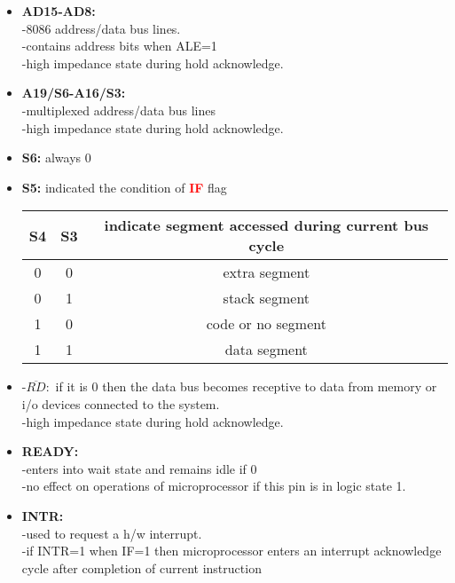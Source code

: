 \documentclass[12pt]{article}
\begin{document}
\begin{itemize}
\begin{itemize}
		\item \textbf{AD15-AD8:}\\
		-8086 address/data bus lines.\\
		-contains address bits when ALE=1\\
		-high impedance state during hold acknowledge.\\
		
		\item \textbf{A19/S6-A16/S3:}\\
		-multiplexed address/data bus lines\\
		-high impedance state during hold acknowledge.\\
		
		\item\textbf{S6:} always 0\\
		\item\textbf{S5:} indicated the condition of \textbf{\textcolor{red}{IF}} flag\\
		
		\begin{table}[H]
			\centering
			\begin{tabular}{|c|c|c|}
				\hline
				S4 & S3 & indicate segment accessed  during current bus cycle\\\hline
				
				0 & 0 & extra segment\\\hline
				0 & 1 & stack segment\\\hline
				1 & 0 & code or no segment\\\hline
				1 & 1 & data segment\\\hline
			\end{tabular}
		\end{table}
	
		\item -$\overline{RD}:$ if it is 0 then the data bus becomes receptive to data from memory or i/o devices connected to the system.\\
		-high impedance state during hold acknowledge.\\
		
		\item\textbf{READY:}\\
		-enters into wait state and remains idle if 0\\
		-no effect on operations of microprocessor if this pin is in logic state 1.\\
		
		\item\textbf{INTR:}\\
		-used to request a h/w interrupt.\\
		-if INTR=1 when IF=1 then microprocessor enters an interrupt acknowledge cycle after completion of current instruction\\
		

\end{itemize}
\end{itemize}
\end{document}
